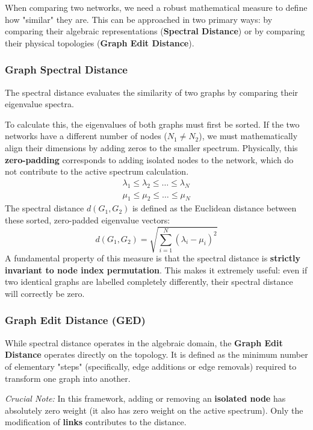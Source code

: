 When comparing two networks, we need a robust mathematical measure to define how "similar" they are. This can be approached in two primary ways: by comparing their algebraic representations (\textbf{Spectral Distance}) or by comparing their physical topologies (\textbf{Graph Edit Distance}).

\subsubsection{Graph Spectral Distance}
The spectral distance evaluates the similarity of two graphs by comparing their eigenvalue spectra.

To calculate this, the eigenvalues of both graphs must first be sorted. If the two networks have a different number of nodes ($N_1 \neq N_2$), we must mathematically align their dimensions by adding zeros to the smaller spectrum. Physically, this \textbf{zero-padding} corresponds to adding isolated nodes to the network, which do not contribute to the active spectrum calculation.
\[
    \begin{aligned}
        \lambda_1 \leq \lambda_2 \leq \ldots \leq \lambda_N \\
        \mu_1 \leq \mu_2 \leq \ldots \leq \mu_N
    \end{aligned}
\]
The spectral distance $d(G_1, G_2)$ is defined as the Euclidean distance between these sorted, zero-padded eigenvalue vectors:
\[
    d(G_1, G_2) = \sqrt{\sum_{i=1}^N (\lambda_i - \mu_i)^2}
\]
A fundamental property of this measure is that the spectral distance is \textbf{strictly invariant to node index permutation}. This makes it extremely useful: even if two identical graphs are labelled completely differently, their spectral distance will correctly be zero.

\subsubsection{Graph Edit Distance (GED)}
While spectral distance operates in the algebraic domain, the \textbf{Graph Edit Distance} operates directly on the topology. It is defined as the minimum number of elementary "steps" (specifically, edge additions or edge removals) required to transform one graph into another.

\textit{Crucial Note:} In this framework, adding or removing an \textbf{isolated node} has absolutely zero weight (it also has zero weight on the active spectrum). Only the modification of \textbf{links} contributes to the distance.

